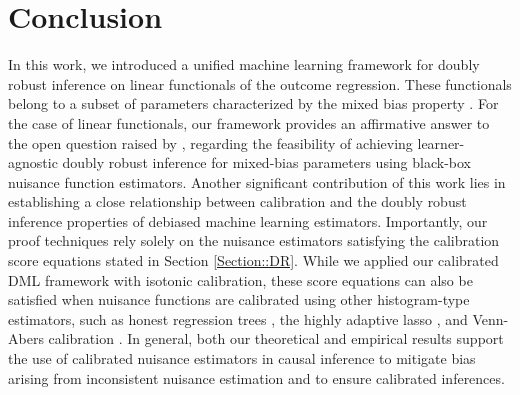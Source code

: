\documentclass[11pt]{article}
\theoremstyle{plain}
\begin{document}
 


 


  
\section{Conclusion}\label{section::conclusion}

In this work, we introduced a unified machine learning framework for doubly robust inference on linear functionals of the outcome regression. These functionals belong to a subset of parameters characterized by the mixed bias property \citep{rotnitzky2021characterization}. For the case of linear functionals, our framework provides an affirmative answer to the open question raised by \cite{smucler2019unifying}, regarding the feasibility of achieving learner-agnostic doubly robust inference for mixed-bias parameters using black-box nuisance function estimators. Another significant contribution of this work lies in establishing a close relationship between calibration and the doubly robust inference properties of debiased machine learning estimators. Importantly, our proof techniques rely solely on the nuisance estimators satisfying the calibration score equations stated in Section \ref{Section::DR}. While we applied our calibrated DML framework with isotonic calibration, these score equations can also be satisfied when nuisance functions are calibrated using other histogram-type estimators, such as honest regression trees \citep{wager2018estimation}, the highly adaptive lasso \citep{van2017generally, benkeser2016highly, fang2021multivariate}, and Venn-Abers calibration \citep{vovk2012venn, van2024self, van2025generalized}. In general, both our theoretical and empirical results support the use of calibrated nuisance estimators in causal inference to mitigate bias arising from inconsistent nuisance estimation and to ensure calibrated inferences.

 
\end{document}
